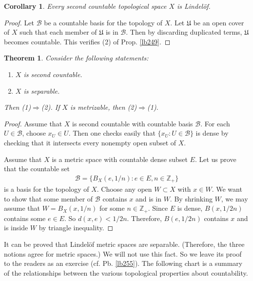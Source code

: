 \documentclass[12pt,b5paper,notitlepage]{article}
\theoremstyle{definition}
\theoremstyle{plain}
\newtheorem{thm}[df]{Theorem}
\newtheorem{co}[df]{Corollary}
\newcommand{\fk}{\mathfrak}
\newcommand{\mc}{\mathcal}
\newcommand{\Zbb}{\mathbb Z}
\numberwithin{equation}{section}
\begin{document}
\begin{co}\label{lb265}
Every second countable topological space $X$ is Lindel\"of.
\end{co}

\begin{proof}
Let $\mc B$ be a countable basis for the topology of $X$. Let $\fk U$ be an open cover of $X$ such that each member of $\fk U$ is in $\mc B$. Then by discarding duplicated terms, $\fk U$ becomes countable. This verifies (2) of Prop. \ref{lb249}.
\end{proof}


\begin{thm}\label{lb250}
Consider the following statements:
\begin{enumerate}[label=(\arabic*)]
\item $X$ is second countable.
\item $X$ is separable.
\end{enumerate}
Then (1)$\Rightarrow$(2). If $X$ is metrizable, then (2)$\Rightarrow$(1).
\end{thm}



\begin{proof}
Assume that $X$ is second countable with countable basis $\mc B$. For each $U\in\mc B$, choose $x_U\in U$. Then one checks easily that $\{x_U:U\in\mc B\}$ is dense by checking that it intersects every nonempty open subset of $X$.

Assume that $X$ is a metric space with countable dense subset $E$. Let us prove that the countable set
\begin{align*}
\mc B=\{B_X(e,1/n):e\in E,n\in\Zbb_+\}
\end{align*}
is a basis for the topology of $X$. Choose any open $W\subset X$ with $x\in W$. We want to show that some member of $\mc B$ contains $x$ and is in $W$. By shrinking $W$, we may assume that $W=B_X(x,1/n)$ for some $n\in\Zbb_+$. Since $E$ is dense, $B(x,1/2n)$ contains some $e\in E$. So $d(x,e)<1/2n$. Therefore,  $B(e,1/2n)$ contains $x$  and is inside $W$ by triangle inequality.
\end{proof}


It can be proved that Lindel\"of metric spaces are separable. (Therefore, the three notions agree for metric spaces.) We will not use this fact. So we leave its proof to the readers as an exercise (cf. Pb. \ref{lb255}). The following chart is a summary of the relationships between the various topological properties about countability.
\end{document}
